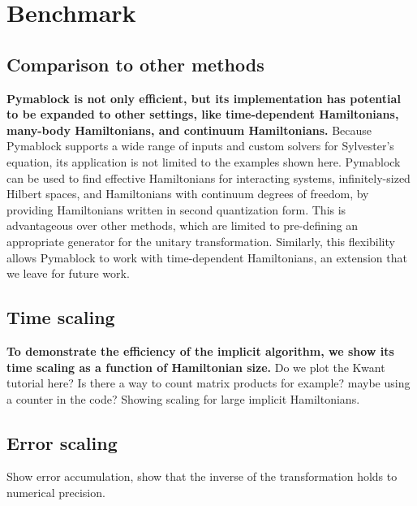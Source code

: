 \section{Benchmark}

\subsection{Comparison to other methods}

\textbf{Pymablock is not only efficient, but its implementation has potential
to be expanded to other settings, like time-dependent Hamiltonians, many-body
Hamiltonians, and continuum Hamiltonians.}
Because Pymablock supports a wide range of inputs and custom solvers for
Sylvester's equation, its application is not limited to the examples shown
here.
Pymablock can be used to find effective Hamiltonians for interacting systems,
infinitely-sized Hilbert spaces, and Hamiltonians with continuum degrees of
freedom, by providing Hamiltonians written in second quantization form.
This is advantageous over other methods, which are limited to pre-defining
an appropriate generator for the unitary transformation.
Similarly, this flexibility allows Pymablock to work with time-dependent
Hamiltonians, an extension that we leave for future work.

\subsection{Time scaling}

\textbf{To demonstrate the efficiency of the implicit algorithm, we show its time
scaling as a function of Hamiltonian size.}
Do we plot the Kwant tutorial here? Is there a way to count matrix products for
example? maybe using a counter in the code?
Showing scaling for large implicit Hamiltonians.

\subsection{Error scaling}

Show error accumulation, show that the inverse of the transformation holds to numerical precision.
